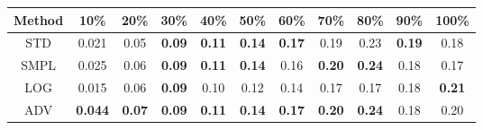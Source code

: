 \documentclass{standalone}
\begin{document}
\begin{tabular}{c|cccccccccc}
      \toprule
      Method & 10\% & 20\% & 30\% & 40\% & 50\% & 60\% & 70\% & 80\% & 90\% & 100\% \\
      \midrule
STD & 0.021 & 0.05 & \textbf{0.09} & \textbf{0.11} & \textbf{0.14} & \textbf{0.17} & 0.19 & 0.23 & \textbf{0.19} & 0.18\\
SMPL & 0.025 & 0.06 & \textbf{0.09} & \textbf{0.11} & \textbf{0.14} & 0.16 & \textbf{0.20} & \textbf{0.24} & 0.18 & 0.17\\
LOG & 0.015 & 0.06 & \textbf{0.09} & 0.10 & 0.12 & 0.14 & 0.17 & 0.17 & 0.18 & \textbf{0.21}\\
ADV & \textbf{0.044} & \textbf{0.07} & \textbf{0.09} & \textbf{0.11} & \textbf{0.14} & \textbf{0.17} & \textbf{0.20} & \textbf{0.24} & 0.18 & 0.20\\
  \bottomrule
\end{tabular}
\end{document}
